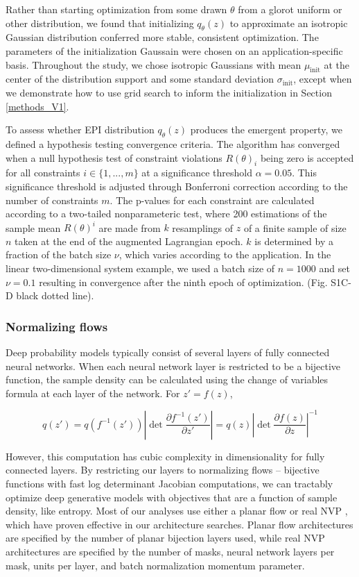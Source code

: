 \documentclass[11pt]{article}
\begin{document}
Rather than starting optimization from some drawn $\theta$ from a glorot uniform or other distribution, we found that initializing $q_\theta(z)$ to approximate an isotropic Gaussian distribution conferred more stable, consistent optimization.  The parameters of the initialization Gaussain were chosen on an application-specific basis.  Throughout the study, we chose isotropic Gaussians with  mean $\mu_{\text{init}}$ at the center of the distribution support and some standard deviation $\sigma_{\text{init}}$, except when we demonstrate how to use grid search to inform the initialization in Section \ref{methods_V1}.

To assess whether EPI distribution $q_\theta(z)$ produces the emergent property, we defined a hypothesis testing convergence criteria.  
The algorithm has converged when a null hypothesis test of constraint violations $R(\theta)_i$ being zero is accepted for all constraints $i \in \{1, ..., m\}$ at a significance threshold $\alpha=0.05$.  
This significance threshold is adjusted through Bonferroni correction according to the number of constraints $m$.  
The p-values for each constraint are calculated according to a two-tailed nonparameteric test, where 200 estimations of the sample mean $R(\theta)^i$ are made from $k$ resamplings of $z$ of a finite sample of size $n$ taken at the end of the augmented Lagrangian epoch.
$k$ is determined by a fraction of the batch size $\nu$, which varies according to the application.
In the linear two-dimensional system example, we used a batch size of $n = 1000$ and set $\nu = 0.1$ resulting in convergence after the ninth epoch of optimization. (Fig. S1C-D black dotted line).

\subsubsection{Normalizing flows}\label{methods_NF}
Deep probability models typically consist of several layers of fully connected neural networks.  When each neural network layer is restricted to be a bijective function, the sample density can be calculated using the change of variables formula at each layer of the network.  For $z' = f(z)$,

\begin{equation}
q(z') = q(f^{-1}(z')) \left| \det \frac{\partial f^{-1}(z')}{\partial z'} \right| = q(z) \left| \det \frac{\partial f(z)}{\partial z} \right|^{-1}
\end{equation}

However, this computation has cubic complexity in dimensionality for fully connected layers.  By restricting our layers to normalizing flows \cite{rezende2015variational} -- bijective functions with fast log determinant Jacobian computations, we can tractably optimize deep generative models with objectives that are a function of sample density, like entropy. Most of our analyses use either a planar flow \cite{rezende2015variational} or real NVP \cite{dinh2017density}, which have proven effective in our architecture searches.  Planar flow architectures are specified by the number of planar bijection layers used, while real NVP architectures are specified by the number of masks, neural network layers per mask, units per layer, and batch normalization momentum parameter.
\end{document}
